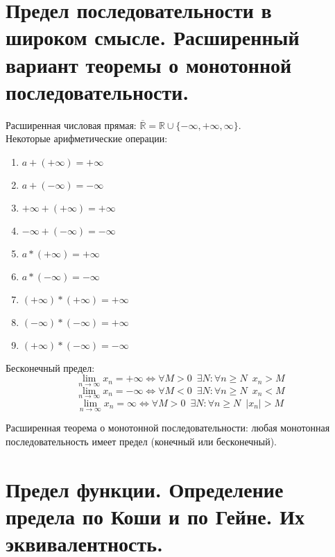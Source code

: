 \documentclass[11pt, a4paper]{article}
\def\R{\mathbb{R}}
\def\sp{\, \, \,}
\def\linf{\lim \limits_{n \to \infty}}
\begin{document}
    \section{Предел последовательности в широком смысле. Расширенный вариант теоремы о монотонной последовательности.}
    Расширенная числовая прямая: $\overline{\R} = \R \cup \{-\infty, +\infty, \infty\}$.\\
    Некоторые арифметические операции:
    \begin{enumerate}
        \item $a + (+\infty) = +\infty$
        \item $a + (-\infty) = -\infty$
        \item $+\infty + (+\infty) = +\infty$
        \item $-\infty + (-\infty) = -\infty$
        \item $a * (+\infty) = +\infty$
        \item $a * (-\infty) = -\infty$
        \item $(+\infty)*(+\infty) = +\infty$
        \item $(-\infty)*(-\infty) = +\infty$
        \item $(+\infty)*(-\infty) = -\infty$
    \end{enumerate}

    Бесконечный предел:
    $$\linf x_n = +\infty \Leftrightarrow \forall M > 0 \sp \exists N: \forall n \geq N \sp x_n > M$$
    $$\linf x_n = -\infty \Leftrightarrow \forall M < 0 \sp \exists N: \forall n \geq N \sp x_n < M$$
    $$\linf x_n = \infty \Leftrightarrow \forall M > 0 \sp \exists N: \forall n \geq N \sp |x_n| > M$$

    Расширенная теорема о монотонной последовательности: любая монотонная последовательность имеет предел (конечный или бесконечный).

    \section{Предел функции. Определение предела по Коши и по Гейне. Их эквивалентность.}
\end{document}
